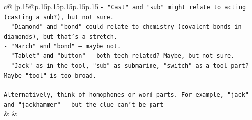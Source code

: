 \documentclass{article}
\begin{document}
{\begin{supertabular}{c@{$\;$}|p{.15\linewidth}@{}p{.15\linewidth}p{.15\linewidth}p{.15\linewidth}p{.15\linewidth}p{.15\linewidth}}
{{{\texttt{{-} "Cast" and "sub" might relate to acting (casting a sub?), but not sure.} \\
\texttt{{-} "Diamond" and "bond" could relate to chemistry (covalent bonds in diamonds), but that's a stretch.} \\
\texttt{{-} "March" and "bond" – maybe not.} \\
\texttt{{-} "Tablet" and "button" – both tech{-}related? Maybe, but not sure.} \\
\texttt{{-} "Jack" as in the tool, "sub" as submarine, "switch" as a tool part? Maybe "tool" is too broad.} \\
\\ 
\texttt{Alternatively, think of homophones or word parts. For example, "jack" and "jackhammer" – but the clue can't be part} \\
            }
        }
    }
    & & \\ \\


\end{supertabular}}
\end{document}
